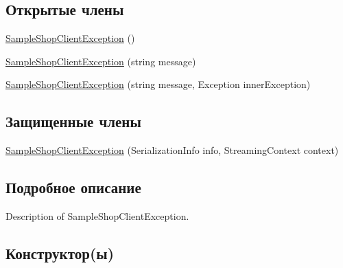 \subsection*{Открытые члены}
\begin{DoxyCompactItemize}
\item 
\hyperlink{class_sample_shop_client_1_1_sample_shop_client_exception_a1417be953fb589b53be3d9e9b7711484}{Sample\+Shop\+Client\+Exception} ()
\item 
\hyperlink{class_sample_shop_client_1_1_sample_shop_client_exception_a3d37d414dbe727dcd38b72e241797a46}{Sample\+Shop\+Client\+Exception} (string message)
\item 
\hyperlink{class_sample_shop_client_1_1_sample_shop_client_exception_a702cf9e0cb83d02b1dcdc3b6155ba5ab}{Sample\+Shop\+Client\+Exception} (string message, Exception inner\+Exception)
\end{DoxyCompactItemize}
\subsection*{Защищенные члены}
\begin{DoxyCompactItemize}
\item 
\hyperlink{class_sample_shop_client_1_1_sample_shop_client_exception_a730a4cc3ee7e6d98ce66bca2526677e5}{Sample\+Shop\+Client\+Exception} (Serialization\+Info info, Streaming\+Context context)
\end{DoxyCompactItemize}


\subsection{Подробное описание}
Description of Sample\+Shop\+Client\+Exception. 



\subsection{Конструктор(ы)}
\hypertarget{class_sample_shop_client_1_1_sample_shop_client_exception_a1417be953fb589b53be3d9e9b7711484}{}

